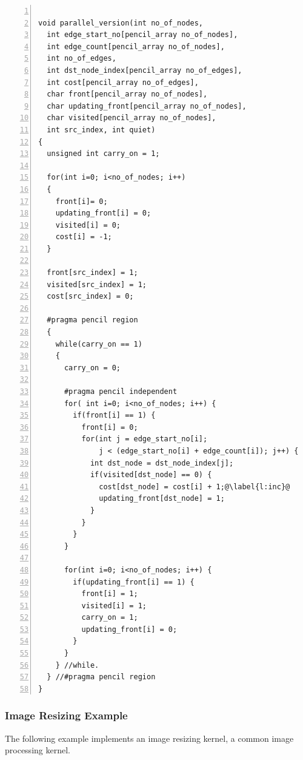 \begin{lstlisting}[language=pencil,escapechar=@, numbers=left,numberstyle={\tiny\tt},numbersep=5pt]

void parallel_version(int no_of_nodes,
  int edge_start_no[pencil_array no_of_nodes],
  int edge_count[pencil_array no_of_nodes],
  int no_of_edges,
  int dst_node_index[pencil_array no_of_edges],
  int cost[pencil_array no_of_edges],
  char front[pencil_array no_of_nodes],
  char updating_front[pencil_array no_of_nodes],
  char visited[pencil_array no_of_nodes],
  int src_index, int quiet)
{
  unsigned int carry_on = 1;

  for(int i=0; i<no_of_nodes; i++)
  {
    front[i]= 0;
    updating_front[i] = 0;
    visited[i] = 0;
    cost[i] = -1;
  }

  front[src_index] = 1;
  visited[src_index] = 1;
  cost[src_index] = 0;

  #pragma pencil region
  {
    while(carry_on == 1)
    {
      carry_on = 0;

      #pragma pencil independent
      for( int i=0; i<no_of_nodes; i++) {
        if(front[i] == 1) {
          front[i] = 0; 
          for(int j = edge_start_no[i]; 
              j < (edge_start_no[i] + edge_count[i]); j++) {
            int dst_node = dst_node_index[j];
            if(visited[dst_node] == 0) {
              cost[dst_node] = cost[i] + 1;@\label{l:inc}@
              updating_front[dst_node] = 1;
            }
          }
        }
      }

      for(int i=0; i<no_of_nodes; i++) {
        if(updating_front[i] == 1) {
          front[i] = 1;
          visited[i] = 1;
          carry_on = 1;
          updating_front[i] = 0;
        }
      }  
    } //while.
  } //#pragma pencil region
}
\end{lstlisting}

\subsubsection{Image Resizing Example}

The following example implements an image resizing kernel,
a common image processing kernel.


